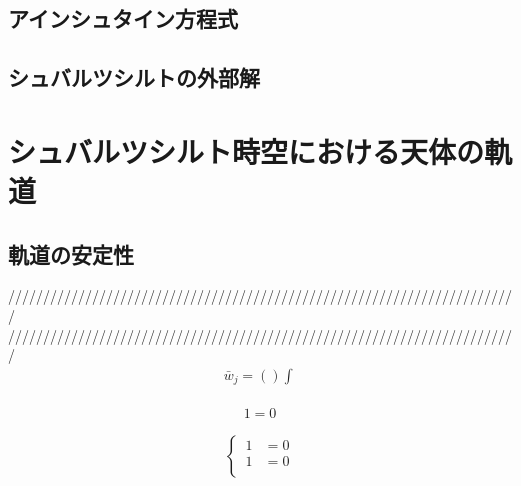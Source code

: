 \documentclass[dvipdfmx]{report} %
\begin{document}
\section{アインシュタイン方程式}


\section{シュバルツシルトの外部解}


\chapter{シュバルツシルト時空における天体の軌道}
\section{軌道の安定性}


/////////////////////////////////////////////////////////////////////////\\
/////////////////////////////////////////////////////////////////////////
\begin{equation*}
\begin{split}
	\bar{w}_j = \left( \right) \int^{}_{}
\end{split}
\end{equation*}

\begin{tcolorbox}[title=メモ用]
\begin{eqnarray*}
	1 = 0
\end{eqnarray*}
\end{tcolorbox}

\begin{equation}
\left\{ \,
\begin{aligned}
	1 &= 0\\
	1 &= 0\\
\end{aligned}
\right.
\end{equation}
\end{document}
